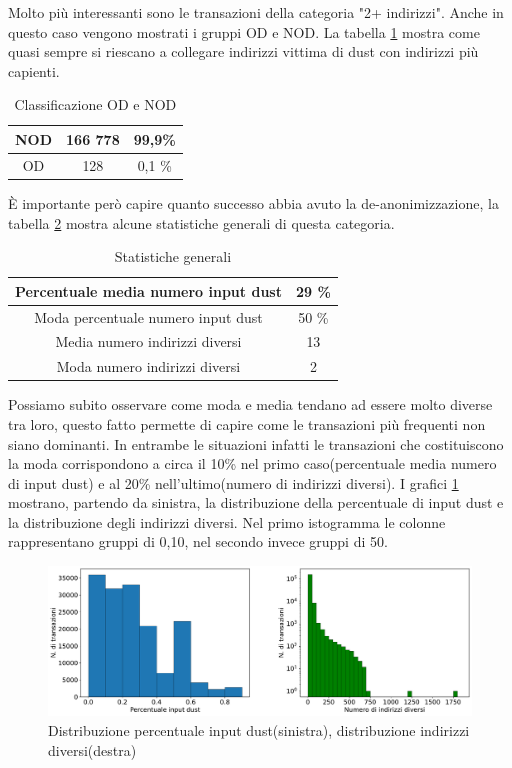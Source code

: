 Molto più interessanti sono le transazioni della categoria "2+ indirizzi". Anche in questo caso vengono mostrati i gruppi OD e NOD. La tabella \ref{tab:OD_NOD_success} mostra come quasi sempre si riescano a collegare indirizzi vittima di dust con indirizzi più capienti.
\begin{table}[H]
    \centering
    \begin{tabular}{|c|c|c|}
        \hline
            NOD  & 166 778 & 99,9\%\\
        \hline 
            OD  & 128 & 0,1 \%\\
        \hline
    \end{tabular}
    \caption{Classificazione OD e NOD}
    \label{tab:OD_NOD_success}
\end{table}
È importante però capire quanto successo abbia avuto la de-anonimizzazione, la tabella \ref{tab:stat} mostra alcune statistiche generali di questa categoria. 
\begin{table}[H]
    \centering
    \begin{tabular}{|c|c|}
        \hline
            Percentuale media numero input dust & 29 \%\\
        \hline
            Moda percentuale numero input dust & 50 \%\\ %
        \hline
            Media numero indirizzi diversi & 13\\
        \hline
            Moda numero indirizzi diversi & 2\\ %
        \hline
    \end{tabular}
    \caption{Statistiche generali}
    \label{tab:stat}
\end{table}
Possiamo subito osservare come moda e media tendano ad essere molto diverse tra loro, questo fatto permette di capire come le transazioni più frequenti non siano dominanti. In entrambe le situazioni infatti le transazioni che costituiscono la moda corrispondono a circa il 10\% nel primo caso(percentuale media numero di input dust) e al 20\% nell'ultimo(numero di indirizzi diversi). I grafici \ref{fig:distribuzioni_tx} mostrano, partendo da sinistra, la distribuzione della percentuale di input dust e la distribuzione degli indirizzi diversi. Nel primo istogramma le colonne rappresentano gruppi di 0,10, nel secondo invece gruppi di 50.
 \begin{figure}[h!]
     \centering
     \includegraphics[scale=0.44]{Grafici/Distribuzioni_belle.pdf}
     \caption{Distribuzione percentuale input dust(sinistra), distribuzione indirizzi diversi(destra)}
    \label{fig:distribuzioni_tx}
 \end{figure}
